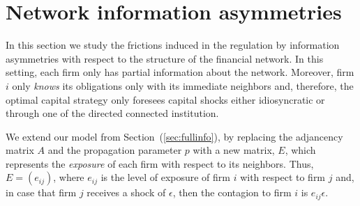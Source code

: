 \section{Network information asymmetries}
In this section we study the frictions induced in the regulation by information asymmetries with respect to the structure of the financial network.   In this setting, each firm only has partial information about the network.  Moreover, firm $i$ only \emph{knows}  its obligations only with its immediate neighbors and, therefore, the optimal capital strategy only foresees capital shocks either idiosyncratic or through one of the directed connected institution.

We extend our model from Section~(\ref{sec:fullinfo}), by replacing the adjancency matrix $A$ and the propagation parameter $p$ with a new matrix, $E$, which represents the \emph{exposure} of each firm with respect to its neighbors.  Thus, $E=(e_{ij})$, where $e_{ij}$ is the level of exposure of firm $i$ with respect to firm $j$ and, in case that firm $j$ receives a shock of $\epsilon$, then the contagion to firm $i$ is $e_{ij}\epsilon$.